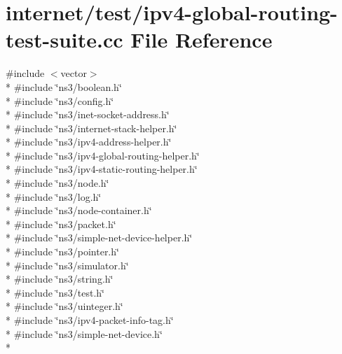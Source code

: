 \hypertarget{ipv4-global-routing-test-suite_8cc}{}\section{internet/test/ipv4-\/global-\/routing-\/test-\/suite.cc File Reference}
\label{ipv4-global-routing-test-suite_8cc}
{\ttfamily \#include $<$vector$>$}\\*
{\ttfamily \#include \char`\"{}ns3/boolean.\+h\char`\"{}}\\*
{\ttfamily \#include \char`\"{}ns3/config.\+h\char`\"{}}\\*
{\ttfamily \#include \char`\"{}ns3/inet-\/socket-\/address.\+h\char`\"{}}\\*
{\ttfamily \#include \char`\"{}ns3/internet-\/stack-\/helper.\+h\char`\"{}}\\*
{\ttfamily \#include \char`\"{}ns3/ipv4-\/address-\/helper.\+h\char`\"{}}\\*
{\ttfamily \#include \char`\"{}ns3/ipv4-\/global-\/routing-\/helper.\+h\char`\"{}}\\*
{\ttfamily \#include \char`\"{}ns3/ipv4-\/static-\/routing-\/helper.\+h\char`\"{}}\\*
{\ttfamily \#include \char`\"{}ns3/node.\+h\char`\"{}}\\*
{\ttfamily \#include \char`\"{}ns3/log.\+h\char`\"{}}\\*
{\ttfamily \#include \char`\"{}ns3/node-\/container.\+h\char`\"{}}\\*
{\ttfamily \#include \char`\"{}ns3/packet.\+h\char`\"{}}\\*
{\ttfamily \#include \char`\"{}ns3/simple-\/net-\/device-\/helper.\+h\char`\"{}}\\*
{\ttfamily \#include \char`\"{}ns3/pointer.\+h\char`\"{}}\\*
{\ttfamily \#include \char`\"{}ns3/simulator.\+h\char`\"{}}\\*
{\ttfamily \#include \char`\"{}ns3/string.\+h\char`\"{}}\\*
{\ttfamily \#include \char`\"{}ns3/test.\+h\char`\"{}}\\*
{\ttfamily \#include \char`\"{}ns3/uinteger.\+h\char`\"{}}\\*
{\ttfamily \#include \char`\"{}ns3/ipv4-\/packet-\/info-\/tag.\+h\char`\"{}}\\*
{\ttfamily \#include \char`\"{}ns3/simple-\/net-\/device.\+h\char`\"{}}\\*

